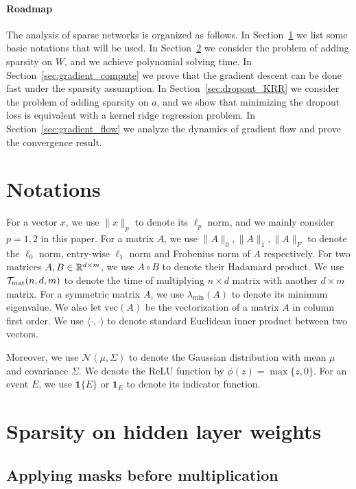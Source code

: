 
\paragraph{Roadmap}
The analysis of sparse networks is organized as follows. In Section~\ref{sec:notations} we list some basic notations that will be used. In Section~\ref{sec:binary_mask_analysis} we consider the problem of adding sparsity on $W$, and we achieve polynomial solving time. In Section~\ref{sec:gradient_compute} we prove that the gradient descent can be done fast under the sparsity assumption. In Section~\ref{sec:dropout_KRR} we consider the problem of adding sparsity on $a$, and we show that minimizing the dropout loss is equivalent with a kernel ridge regression problem. In Section~\ref{sec:gradient_flow} we analyze the dynamics of gradient flow and prove the convergence result.

\section{Notations}\label{sec:notations}

For a vector $x$, we use $\|x\|_p$ to denote its $\ell_p$ norm, and we mainly consider $p = 1, 2$ in this paper. For a matrix $A$, we use $\| A \|_0, \| A \|_1, \| A \|_F$ to denote the $\ell_0$ norm, entry-wise $\ell_1$ norm and Frobenius norm of $A$ respectively. For two matrices $A, B\in\mathbb{R}^{d\times m}$, we use $A\circ B$ to denote their Hadamard product. We use ${\cal T}_{\mathrm{mat}}(n,d,m)$ to denote the time of multiplying $n \times d$ matrix with another $d \times m$ matrix. For a symmetric matrix $A$, we use $\lambda_{\min}(A)$ to denote its minimum eigenvalue. We also let $\mathrm{vec}(A)$ be the vectorization of a matrix $A$ in column first order. We use $\langle \cdot, \cdot \rangle$ to denote standard Euclidean inner product between two vectors.

Moreover, we use $\mathcal{N}(\mu, \Sigma)$ to denote the Gaussian distribution with mean $\mu$ and covariance $\Sigma$. We denote the ReLU function by $\phi(z) = \max \{z, 0\}$. For an event $E$, we use $\mathbf{1} \{E\}$ or $\mathbf{1}_E$ to denote its indicator function.


\section{Sparsity on hidden layer weights}
\label{sec:binary_mask_analysis}
\subsection{Applying masks before multiplication}

